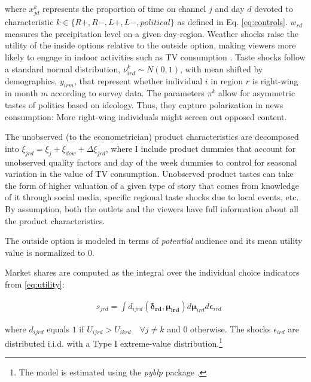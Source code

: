 \documentclass[12pt]{article}
\begin{document}
	where $ x_{jd}^k $ represents the  proportion of time on channel $ j $ and day $ d$ devoted to characteristic $ k \in \{R+,R-,L+,L-,political\}$ as defined in Eq. \eqref{eq:controls}. $w_{rd}$ measures the precipitation level on a given day-region. Weather shocks raise the utility of the inside options  relative to the outside option, making viewers more likely to engage in indoor activities such as TV consumption \citep{wilbur}. Taste shocks follow a standard normal distribution, $ \nu_{ird}^k \sim N(0,1)$, with mean shifted by  demographics, $ y_{irm} $, that represent whether individual $i$ in region $r$ is right-wing in month $m$ according to survey data.	The parameters $\pi^k$ allow for asymmetric tastes of politics based on ideology. Thus, they capture polarization in news consumption: More right-wing individuals might screen out opposed content. 

The unobserved (to the econometrician) product characteristics are decomposed into $\xi_{jrd}= \xi_j + \xi_{dow} + \Delta \xi_{jrd}$, where I include product dummies that account for unobserved quality factors and day of the week dummies to control for  seasonal variation in the value of TV consumption. Unobserved product tastes can take the form of higher valuation of a given type of story that comes from knowledge of it through social media, specific regional taste shocks due to local events,  etc. By assumption, both the outlets and the viewers have full information about all the product characteristics. 

	
	The outside option is modeled in terms of \textit{potential} audience  \citep{berry1994estimating} and its mean utility value is normalized to 0.
	
	Market shares are computed as the integral over the individual choice indicators from \eqref{eq:utility}:  
	
	
	\begin{equation}\label{eq:shares}
	\begin{aligned}
		& s_{jrd} = \int d_{ijrd}(\bm{\delta_{rd}},\bm{\mu_{ird}})d\bm{\mu}_{ird}d\bm{\epsilon}_{ird}
	\end{aligned} 
\end{equation} 
	
	where $d_{ijrd}$ equals $1$ if $U_{ijrd}>U_{ikrd} \quad \forall j\neq k$ and $0$ otherwise. The shocks $\epsilon_{ird}$ are distributed i.i.d. with  a Type I extreme-value distribution.\footnote{The model is estimated using the \textit{pyblp} package \citep{conlon2020best}.} 
\end{document}

